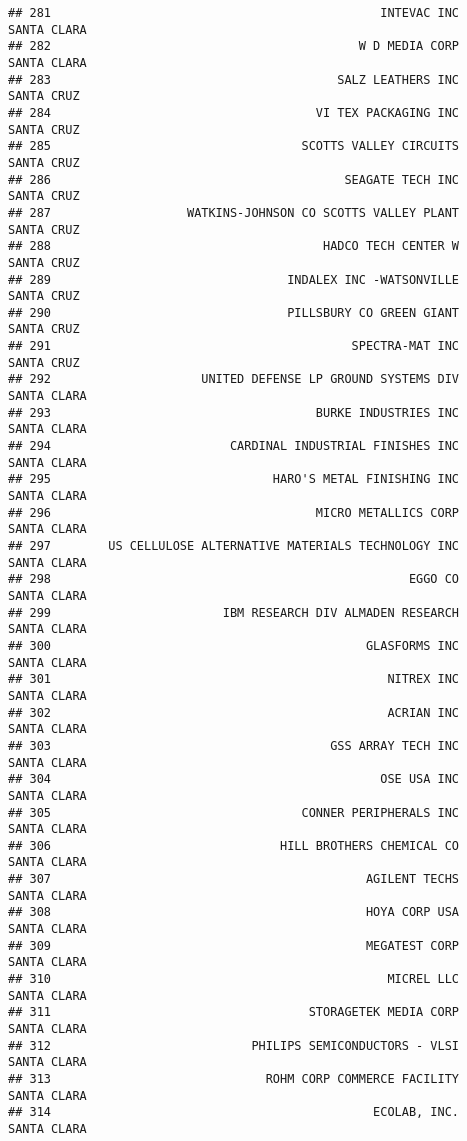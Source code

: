 \documentclass[
]{book}
\begin{document}
\begin{verbatim}
## 281                                              INTEVAC INC   SANTA CLARA
## 282                                           W D MEDIA CORP   SANTA CLARA
## 283                                        SALZ LEATHERS INC    SANTA CRUZ
## 284                                     VI TEX PACKAGING INC    SANTA CRUZ
## 285                                   SCOTTS VALLEY CIRCUITS    SANTA CRUZ
## 286                                         SEAGATE TECH INC    SANTA CRUZ
## 287                   WATKINS-JOHNSON CO SCOTTS VALLEY PLANT    SANTA CRUZ
## 288                                      HADCO TECH CENTER W    SANTA CRUZ
## 289                                 INDALEX INC -WATSONVILLE    SANTA CRUZ
## 290                                 PILLSBURY CO GREEN GIANT    SANTA CRUZ
## 291                                          SPECTRA-MAT INC    SANTA CRUZ
## 292                     UNITED DEFENSE LP GROUND SYSTEMS DIV   SANTA CLARA
## 293                                     BURKE INDUSTRIES INC   SANTA CLARA
## 294                         CARDINAL INDUSTRIAL FINISHES INC   SANTA CLARA
## 295                               HARO'S METAL FINISHING INC   SANTA CLARA
## 296                                     MICRO METALLICS CORP   SANTA CLARA
## 297        US CELLULOSE ALTERNATIVE MATERIALS TECHNOLOGY INC   SANTA CLARA
## 298                                                  EGGO CO   SANTA CLARA
## 299                        IBM RESEARCH DIV ALMADEN RESEARCH   SANTA CLARA
## 300                                            GLASFORMS INC   SANTA CLARA
## 301                                               NITREX INC   SANTA CLARA
## 302                                               ACRIAN INC   SANTA CLARA
## 303                                       GSS ARRAY TECH INC   SANTA CLARA
## 304                                              OSE USA INC   SANTA CLARA
## 305                                   CONNER PERIPHERALS INC   SANTA CLARA
## 306                                HILL BROTHERS CHEMICAL CO   SANTA CLARA
## 307                                            AGILENT TECHS   SANTA CLARA
## 308                                            HOYA CORP USA   SANTA CLARA
## 309                                            MEGATEST CORP   SANTA CLARA
## 310                                               MICREL LLC   SANTA CLARA
## 311                                    STORAGETEK MEDIA CORP   SANTA CLARA
## 312                            PHILIPS SEMICONDUCTORS - VLSI   SANTA CLARA
## 313                              ROHM CORP COMMERCE FACILITY   SANTA CLARA
## 314                                             ECOLAB, INC.   SANTA CLARA

\end{verbatim}
\end{document}
